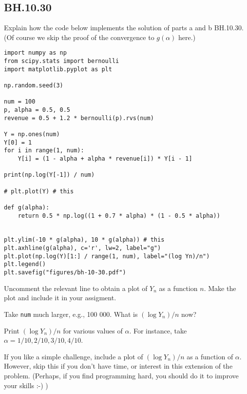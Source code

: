 

\subsection{BH.10.30}

\begin{exercise}
Explain how the code below implements the solution of parts a and b BH.10.30. (Of course we skip the proof of the convergence to $g(\alpha)$ here.)
\end{exercise}

\begin{verbatim}
import numpy as np
from scipy.stats import bernoulli
import matplotlib.pyplot as plt

np.random.seed(3)

num = 100
p, alpha = 0.5, 0.5
revenue = 0.5 + 1.2 * bernoulli(p).rvs(num)

Y = np.ones(num)
Y[0] = 1
for i in range(1, num):
    Y[i] = (1 - alpha + alpha * revenue[i]) * Y[i - 1]

print(np.log(Y[-1]) / num)

# plt.plot(Y) # this

def g(alpha):
    return 0.5 * np.log((1 + 0.7 * alpha) * (1 - 0.5 * alpha))


plt.ylim(-10 * g(alpha), 10 * g(alpha)) # this
plt.axhline(g(alpha), c='r', lw=2, label="g")
plt.plot(np.log(Y)[1:] / range(1, num), label="(log Yn)/n")
plt.legend()
plt.savefig("figures/bh-10-30.pdf")
\end{verbatim}

\begin{exercise}
Uncomment the relevant line to obtain a plot of $Y_{n}$ as a function $n$. Make the plot and include it in your assigment.
\end{exercise}

\begin{exercise}
Take \texttt{num} much larger, e.g., 100 000. What is $(\log Y_n)/n$ now?
\end{exercise}


\begin{exercise}
Print $(\log Y_n)/n$  for various values of $\alpha$. For instance, take $\alpha = 1/10, 2/10, 3/10, 4/10$.
\end{exercise}

\begin{exercise}
If you like a simple challenge, include a plot of $(\log Y_n)/n$ as a function of $\alpha$. However, skip this if you don't have time, or interest in this extension of the problem. (Perhaps, if you find programming hard, you should do it to improve your skills :-) )
\end{exercise}


